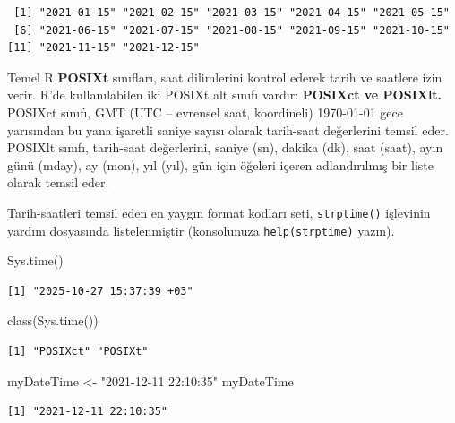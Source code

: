 \documentclass[
  letterpaper,
  DIV=11,
  numbers=noendperiod]{scrreprt}
\newenvironment{Shaded}{\begin{snugshade}}{\end{snugshade}}
\newcommand{\FunctionTok}[1]{\textcolor[rgb]{0.28,0.35,0.67}{#1}}
\newcommand{\NormalTok}[1]{\textcolor[rgb]{0.00,0.23,0.31}{#1}}
\newcommand{\OtherTok}[1]{\textcolor[rgb]{0.00,0.23,0.31}{#1}}
\newcommand{\StringTok}[1]{\textcolor[rgb]{0.13,0.47,0.30}{#1}}
\begin{document}
\begin{verbatim}
 [1] "2021-01-15" "2021-02-15" "2021-03-15" "2021-04-15" "2021-05-15"
 [6] "2021-06-15" "2021-07-15" "2021-08-15" "2021-09-15" "2021-10-15"
[11] "2021-11-15" "2021-12-15"
\end{verbatim}

Temel R \textbf{POSIXt} sınıfları, saat dilimlerini kontrol ederek tarih
ve saatlere izin verir. R'de kullanılabilen iki POSIXt alt sınıfı
vardır: \textbf{POSIXct ve POSIXlt.} POSIXct sınıfı, GMT (UTC --
evrensel saat, koordineli) 1970-01-01 gece yarısından bu yana işaretli
saniye sayısı olarak tarih-saat değerlerini temsil eder. POSIXlt sınıfı,
tarih-saat değerlerini, saniye (sn), dakika (dk), saat (saat), ayın günü
(mday), ay (mon), yıl (yıl), gün için öğeleri içeren adlandırılmış bir
liste olarak temsil eder.

Tarih-saatleri temsil eden en yaygın format kodları seti,
\texttt{strptime()} işlevinin yardım dosyasında listelenmiştir
(konsolunuza \texttt{help(strptime)} yazın).

\begin{Shaded}
\begin{Highlighting}[]
\FunctionTok{Sys.time}\NormalTok{()}
\end{Highlighting}
\end{Shaded}

\begin{verbatim}
[1] "2025-10-27 15:37:39 +03"
\end{verbatim}

\begin{Shaded}
\begin{Highlighting}[]
\FunctionTok{class}\NormalTok{(}\FunctionTok{Sys.time}\NormalTok{())}
\end{Highlighting}
\end{Shaded}

\begin{verbatim}
[1] "POSIXct" "POSIXt" 
\end{verbatim}

\begin{Shaded}
\begin{Highlighting}[]
\NormalTok{myDateTime }\OtherTok{\textless{}{-}} \StringTok{"2021{-}12{-}11 22:10:35"}
\NormalTok{myDateTime}
\end{Highlighting}
\end{Shaded}

\begin{verbatim}
[1] "2021-12-11 22:10:35"
\end{verbatim}
\end{document}
